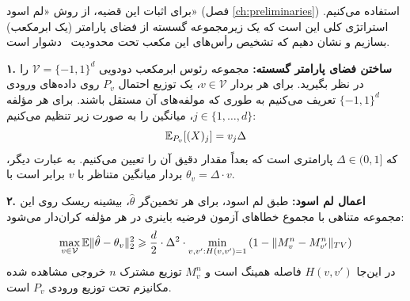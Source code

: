 \begin{اثبات}
برای اثبات این قضیه، از روش «لم اسود» (فصل \ref{ch:preliminaries}) استفاده می‌کنیم. استراتژی کلی این است که یک زیرمجموعه گسسته از فضای پارامتر (یک ابرمکعب) بسازیم و نشان دهیم که تشخیص رأس‌های این مکعب تحت محدودیت \LDP\ دشوار است.

\textbf{۱. ساختن فضای پارامتر گسسته:}
مجموعه رئوس ابرمکعب دودویی $\mathcal{V} = \{-1, 1\}^d$ را در نظر بگیرید. برای هر بردار $v \in \mathcal{V}$، یک توزیع احتمال $P_v$ روی داده‌های ورودی $\{-1, 1\}^d$ تعریف می‌کنیم به طوری که مولفه‌های آن مستقل باشند. برای هر مؤلفه $j \in \{1, \dots, d\}$، میانگین را به صورت زیر تنظیم می‌کنیم:
\begin{equation}
\Eset_{P_v}[(X)_j] = v_j \Delta
\end{equation}
که $\Delta \in (0, 1]$ پارامتری است که بعداً مقدار دقیق آن را تعیین می‌کنیم. به عبارت دیگر، بردار میانگین متناظر با $v$ برابر است با $\theta_v = \Delta \cdot v$.

\textbf{۲. اعمال لم اسود:}
طبق لم اسود، برای هر تخمین‌گر $\hat{\theta}$، بیشینه ریسک روی این مجموعه متناهی با مجموع خطاهای آزمون فرضیه باینری در هر مؤلفه کران‌دار می‌شود:
\begin{equation}
\label{eq:assouad-step1}
\max_{v \in \mathcal{V}} \Eset \|\hat{\theta} - \theta_v\|_2^2 \ge \frac{d}{2} \cdot \Delta^2 \cdot \min_{v, v': H(v, v')=1} \left( 1 - \|M_v^n - M_{v'}^n\|_{TV} \right)
\end{equation}
در این‌جا $H(v, v')$ فاصله همینگ است و $M_v^n$ توزیع مشترک $n$ خروجی مشاهده شده مکانیزم \mech تحت توزیع ورودی $P_v$ است.


\end{اثبات}
